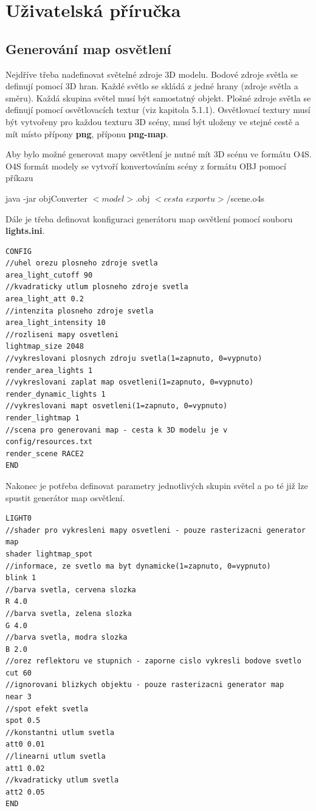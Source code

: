 \documentclass[11pt,twoside,a4paper]{book}
\begin{document}
\chapter{Uživatelská příručka}

\section{Generování map osvětlení}
Nejdříve třeba nadefinovat světelné zdroje 3D modelu. Bodové zdroje světla se definují pomocí 3D hran. Každé světlo se skládá z jedné hrany (zdroje světla a směru). Každá skupina světel musí být samostatný objekt. Plošné zdroje světla se definují pomocí osvětlovacích textur (viz kapitola 5.1.1). Osvětlovací textury musí být vytvořeny pro každou texturu 3D scény, musí být uloženy ve stejné cestě a mít místo přípony \textbf{png}, příponu \textbf{png-map}.

Aby bylo možné generovat mapy osvětlení je nutné mít 3D scénu ve formátu O4S. O4S formát modely se vytvoří konvertováním scény z formátu OBJ pomocí příkazu
\begin{center}
java -jar objConverter $<model>$.obj $<cesta$ $exportu>$/scene.o4s
\end{center}

Dále je třeba definovat konfiguraci generátoru map osvětlení pomocí souboru \textbf{lights.ini}.

\begin{lstlisting}[caption=Konfigurace generátoru map osvětlení]
CONFIG
//uhel orezu plosneho zdroje svetla
area_light_cutoff 90
//kvadraticky utlum plosneho zdroje svetla
area_light_att 0.2
//intenzita plosneho zdroje svetla
area_light_intensity 10
//rozliseni mapy osvetleni
lightmap_size 2048
//vykreslovani plosnych zdroju svetla(1=zapnuto, 0=vypnuto)
render_area_lights 1
//vykreslovani zaplat map osvetleni(1=zapnuto, 0=vypnuto)
render_dynamic_lights 1
//vykreslovani mapt osvetleni(1=zapnuto, 0=vypnuto)
render_lightmap 1
//scena pro generovani map - cesta k 3D modelu je v config/resources.txt
render_scene RACE2
END
\end{lstlisting}

Nakonec je potřeba definovat parametry jednotlivých skupin světel a po té již lze spustit generátor map osvětlení.
\begin{lstlisting}[caption=Konfigurace světla pro generátor map osvětlení]
LIGHT0
//shader pro vykresleni mapy osvetleni - pouze rasterizacni generator map
shader lightmap_spot
//informace, ze svetlo ma byt dynamicke(1=zapnuto, 0=vypnuto)
blink 1
//barva svetla, cervena slozka
R 4.0
//barva svetla, zelena slozka
G 4.0
//barva svetla, modra slozka
B 2.0
//orez reflektoru ve stupnich - zaporne cislo vykresli bodove svetlo
cut 60
//ignorovani blizkych objektu - pouze rasterizacni generator map
near 3
//spot efekt svetla
spot 0.5
//konstantni utlum svetla
att0 0.01
//linearni utlum svetla
att1 0.02
//kvadraticky utlum svetla
att2 0.05
END
\end{lstlisting}
\end{document}
